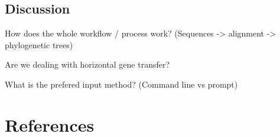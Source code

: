 \documentclass[
  11pt,
  letterpaper,
  oneside]{book}
\newlength{\cslhangindent}
\newlength{\cslentryspacingunit} %
\newenvironment{CSLReferences}[2] %
 {%
  \setlength{\parindent}{0pt}
  \ifodd #1
  \let\oldpar\par
  \def\par{\hangindent=\cslhangindent\oldpar}
  \fi
  \setlength{\parskip}{#2\cslentryspacingunit}
 }%
 {}
\begin{document}
\hypertarget{discussion-1}{%
\section{Discussion}\label{discussion-1}}

How does the whole workflow / process work? (Sequences -\textgreater{}
alignment -\textgreater{} phylogenetic trees)

Are we dealing with horizontal gene transfer?

What is the prefered input method? (Command line vs prompt)


\hypertarget{references}{%
\chapter*{References}\label{references}}


\hypertarget{refs}{}
\begin{CSLReferences}{0}{0}
\end{CSLReferences}


\backmatter
\end{document}
